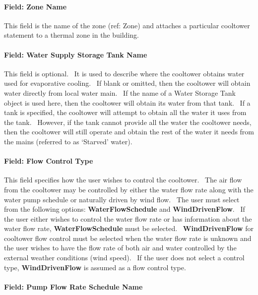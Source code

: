 \paragraph{Field: Zone Name}\label{field-zone-name-6}

This field is the name of the zone (ref: Zone) and attaches a particular cooltower statement to a thermal zone in the building.

\paragraph{Field: Water Supply Storage Tank Name}\label{field-water-supply-storage-tank-name}

This field is optional. ~It is used to describe where the cooltower obtains water used for evaporative cooling. ~If blank or omitted, then the cooltower will obtain water directly from local water main. ~If the name of a Water Storage Tank object is used here, then the cooltower will obtain its water from that tank. ~If a tank is specified, the cooltower will attempt to obtain all the water it uses from the tank. ~However, if the tank cannot provide all the water the cooltower needs, then the cooltower will still operate and obtain the rest of the water it needs from the mains (referred to as `Starved' water).

\paragraph{Field: Flow Control Type}\label{field-flow-control-type}

This field specifies how the user wishes to control the cooltower.~ The air flow from the cooltower may be controlled by either the water flow rate along with the water pump schedule or naturally driven by wind flow.~ The user must select from the following options: \textbf{WaterFlowSchedule} and \textbf{WindDrivenFlow}.~ If the user either wishes to control the water flow rate or has information about the water flow rate, \textbf{WaterFlowSchedule} must be selected.~ \textbf{WindDrivenFlow} for cooltower flow control must be selected when the water flow rate is unknown and the user wishes to have the flow rate of both air and water controlled by the external weather conditions (wind speed).~ If the user does not select a control type, \textbf{WindDrivenFlow} is assumed as a flow control type.

\paragraph{Field: Pump Flow Rate Schedule Name}\label{field-pump-flow-rate-schedule-name}

